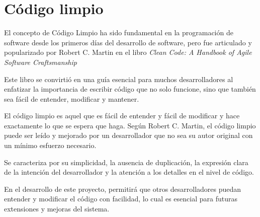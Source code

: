 \section{Código limpio}\label{sec:clean_code}

El concepto de Código Limpio ha sido fundamental en la programación de software desde los primeros días del desarrollo
de software, pero fue articulado y popularizado por Robert C. Martin en el libro
\textit{Clean Code: A Handbook of Agile Software Craftsmanship}~\cite{book_martin_2008}

Este libro se convirtió en una guía esencial para muchos desarrolladores al enfatizar la importancia de escribir código
que no solo funcione, sino que también sea fácil de entender, modificar y mantener.

El código limpio es aquel que es fácil de entender y fácil de modificar y hace exactamente lo que se espera que haga.
Según Robert C. Martin, el código limpio puede ser leído y mejorado por un desarrollador que no sea su autor original
con un mínimo esfuerzo necesario.

Se caracteriza por su simplicidad, la ausencia de duplicación, la expresión clara de la intención del desarrollador y
la atención a los detalles en el nivel de código.

En el desarrollo de este proyecto, permitirá que otros desarrolladores puedan entender y modificar el código con
facilidad, lo cual es esencial para futuras extensiones y mejoras del sistema.
